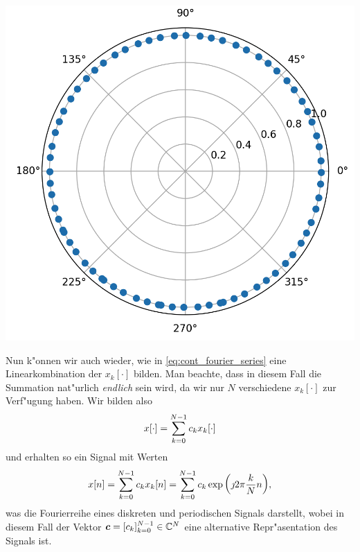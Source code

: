 \begin{listing}
\begin{minipage}{0.3\textwidth}
        \includegraphics[width=\textwidth]{code/disc_harms_comp_e.png}
    \end{minipage}
    \label{py:disc_harms_comp}
\end{listing}

Nun k"onnen wir auch wieder, wie in \eqref{eq:cont_fourier_series} eine Linearkombination der $x_k[\cdot]$ bilden.
Man beachte, dass in diesem Fall die Summation nat"urlich \emph{endlich} sein wird, da wir nur $N$ verschiedene $x_k[\cdot]$ zur Verf"ugung haben.
Wir bilden also
\[
    x[\cdot] = {\sum\limits_{k = 0}^{N-1}{c_k x_k[\cdot]}}
\]
und erhalten so ein Signal mit Werten
\begin{equation}\label{eq:disc_fourier_series}
    x[n] 
        = {\sum\limits_{k = 0}^{N-1}{c_k x_k[n]}} 
        = {\sum\limits_{k = 0}^{N-1}{
            c_k \exp\left(
                \jmath 2 \pi \frac{k}{N} n
            \right) 
        }},
\end{equation}
was die Fourierreihe eines diskreten und periodischen Signals darstellt, wobei in diesem Fall der Vektor $\bm c = [c_k]_{k=0}^{N-1} \in \mathbb{C}^N$ eine alternative Repr"asentation des Signals ist.

